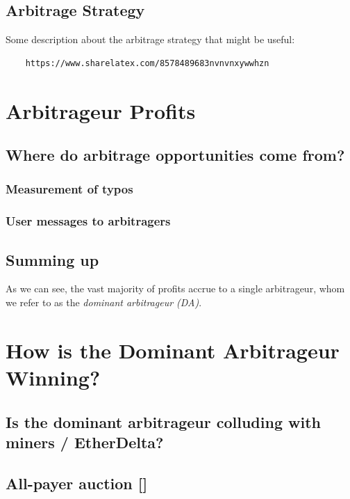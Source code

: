\documentclass[conference]{IEEEtran}
\begin{document}
\subsection{Arbitrage Strategy}
Some description about the arbitrage strategy that might be useful:
\begin{verbatim}
    https://www.sharelatex.com/8578489683nvnvnxywwhzn
\end{verbatim}

\section{Arbitrageur Profits}


\subsection{Where do arbitrage opportunities come from?}

\subsubsection{Measurement of typos}

\subsubsection{User messages to arbitragers}

\subsection{Summing up}
As we can see, the vast majority of profits accrue to a single arbitrageur, whom we refer to as the {\em dominant arbitrageur (DA)}.

\section{How is the Dominant Arbitrageur Winning?}

\subsection{Is the dominant arbitrageur colluding with miners / EtherDelta?}



\subsection{All-payer auction [\color{red}{Ethan}]}
\end{document}
